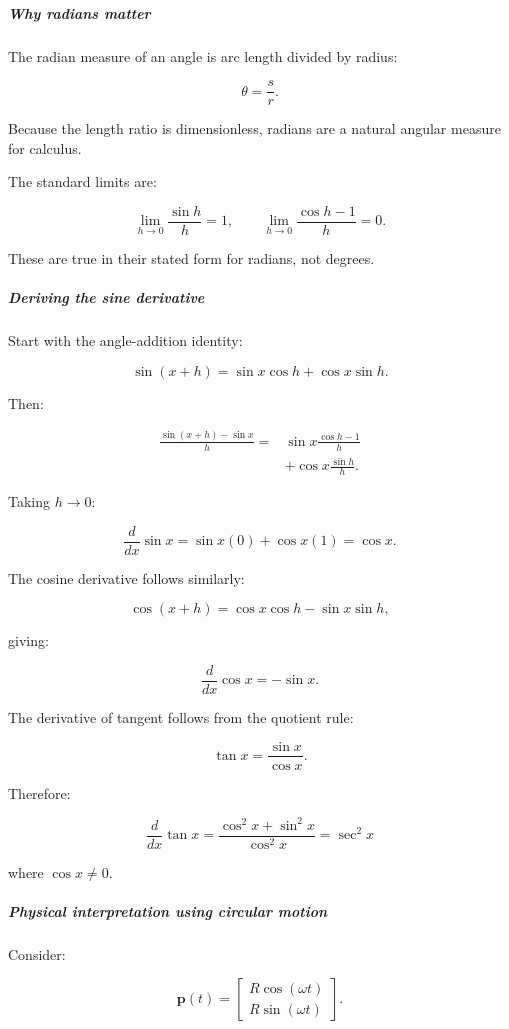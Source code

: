 \subparagraph{Why radians matter}\label{01-foundations-i-ch020-why-radians-matter}

The radian measure of an angle is arc length divided by radius:

\[
\theta=\frac{s}{r}.
\]

Because the length ratio is dimensionless, radians are a natural angular measure for calculus.

The standard limits are:

\[
\lim_{h\to0}\frac{\sin h}{h}=1, \qquad \lim_{h\to0}\frac{\cos h-1}{h}=0.
\]

These are true in their stated form for radians, not degrees.

\subparagraph{Deriving the sine derivative}\label{01-foundations-i-ch020-deriving-the-sine-derivative}

Start with the angle-addition identity:

\[
\sin(x+h)=\sin x\cos h+\cos x\sin h.
\]

Then:

\[
\begin{aligned} \frac{\sin(x+h)-\sin x}{h} =&\sin x\frac{\cos h-1}{h}\\ &+\cos x\frac{\sin h}{h}. \end{aligned}
\]

Taking \(h\to0\):

\[
\frac d{dx}\sin x =\sin x(0)+\cos x(1) =\cos x.
\]

The cosine derivative follows similarly:

\[
\cos(x+h)=\cos x\cos h-\sin x\sin h,
\]

giving:

\[
\frac d{dx}\cos x=-\sin x.
\]

The derivative of tangent follows from the quotient rule:

\[
\tan x=\frac{\sin x}{\cos x}.
\]

Therefore:

\[
\frac d{dx}\tan x = \frac{\cos^2x+\sin^2x}{\cos^2x} = \boxed{\sec^2x}
\]

where \(\cos x\ne0\).

\subparagraph{Physical interpretation using circular motion}\label{01-foundations-i-ch020-physical-interpretation-using-circular-motion}

Consider:

\[
\mathbf p(t)= \begin{bmatrix} R\cos(\omega t)\\ R\sin(\omega t) \end{bmatrix}.
\]

